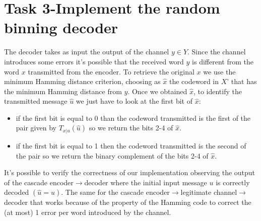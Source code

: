 \documentclass{report}
\begin{document}
\section*{Task 3-Implement the random binning decoder}
The decoder takes as input the output of the channel $y\in Y$. Since the channel introduces some errors it’s possible that the received word $y$ is different from the word $x$ transmitted from the encoder. To retrieve the original $x$ we use the minimum Hamming distance criterion, choosing as $\hat{x}$ the codeword in $X’$ that has the minimum Hamming distance from $y$. Once we obtained $\hat{x}$, to identify the transmitted message $\hat{u}$ we just have to look at the first bit of $\hat{x}$: 
\begin{itemize}
\item if the first bit is equal to 0 than the codeword transmitted is the first of the pair given by $T_{x|u}(\hat{u})$ so we return the bits 2-4 of $\hat{x}$. 
\item if the first bit is equal to 1 then the codeword transmitted is the second of the pair so we return the binary complement of the bits 2-4 of $\hat{x}$. 
\end{itemize}
It’s possible to verify the correctness of our implementation observing the output of the cascade  encoder$\to$decoder where the initial input message $u$ is correctly decoded $(\hat{u}=u)$. The same for the  cascade encoder$\to$legitimate channel$\to$decoder that works because of the property of the Hamming code to correct the (at most) 1 error per word introduced by the channel. 
\end{document}
